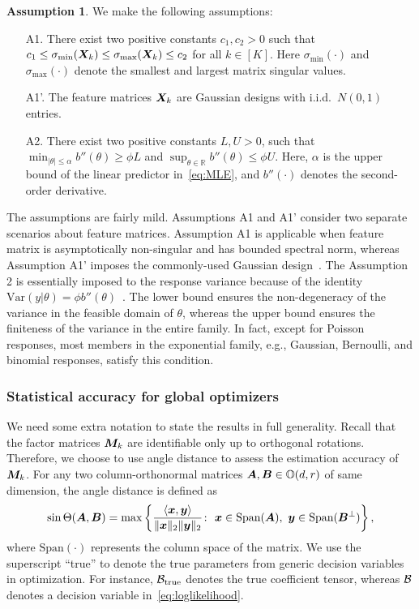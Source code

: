 \documentclass[12pt]{article}
\theoremstyle{definition}
\theoremstyle{definition}
\newtheorem{assumption}{Assumption}
\begin{document}
\begin{assumption}\label{ass}We make the following assumptions:
\begin{enumerate}[noitemsep,topsep=0pt]
\item [A1.] There exist two positive constants $c_1, c_2>0$ such that $c_1\leq \sigma_{\min}(\bm X_k)\leq  \sigma_{\max}(\bm X_k)\leq c_2$ for all $k\in[K]$. Here $\sigma_{\min}(\cdot)$ and $\sigma_{\max}(\cdot)$ denote the smallest and largest matrix singular values.
\item [A1'.] The feature matrices $\bm X_k$ are Gaussian designs with i.i.d.\ $N(0,1)$ entries.
\item [A2.] There exist two positive constants $L, U>0$, such that $\min_{|\theta|\leq \alpha}b''(\theta)\geq \phi L$ and $\sup_{\theta\in \mathbb{R}}b''(\theta)\leq \phi U$. Here, $\alpha$ is the upper bound of the linear predictor in~\eqref{eq:MLE}, and $b''(\cdot)$ denotes the second-order derivative.
\end{enumerate}
\end{assumption}
The assumptions are fairly mild. Assumptions A1 and A1' consider two separate scenarios about feature matrices. Assumption A1 is applicable when feature matrix is asymptotically non-singular and has bounded spectral norm, whereas Assumption A1' imposes the commonly-used Gaussian design~\citep{raskutti2019convex}.  The Assumption 2 is essentially imposed to the response variance because of the identity $\text{Var}(y|\theta)=\phi b''(\theta)$~\citep{mccullagh1989generalized}. The lower bound  ensures the non-degeneracy of the variance in the feasible domain of $\theta$, whereas the upper bound ensures the finiteness of the variance in the entire family. In fact, except for Poisson responses, most members in the exponential family, e.g., Gaussian, Bernoulli, and binomial responses, satisfy this condition. 


\subsubsection{Statistical accuracy for global optimizers}\label{sec:global}
We need some extra notation to state the results in full generality. Recall that the factor matrices $\bm M_k$ are identifiable only up to orthogonal rotations. Therefore, we choose to use angle distance to assess the estimation accuracy of $\bm M_k$. For any two column-orthonormal matrices $\bm A,\bm B\in\mathbb{O}(d,r)$ of same dimension, the angle distance is defined as
\[
\sin \Theta(\bm A,\bm B)=\max\left\{ \frac{\langle \bm x, \bm{y}\rangle}{\lVert\bm x\rVert_2\lVert\bm{y}\rVert_2}\colon \ \bm x\in \textup{Span}(\bm A),\ \bm{y}\in \textup{Span}(\bm B^{\perp})\right\},
\]
where $\text{Span}(\cdot)$ represents the column space of the matrix. We use the superscript ``true'' to denote the true parameters from generic decision variables in optimization. For instance, $\mathcal{B}_{\textup{true}}$ denotes the true coefficient tensor, whereas $\mathcal{B}$ denotes a decision variable in~\eqref{eq:loglikelihood}. 
\end{document}
